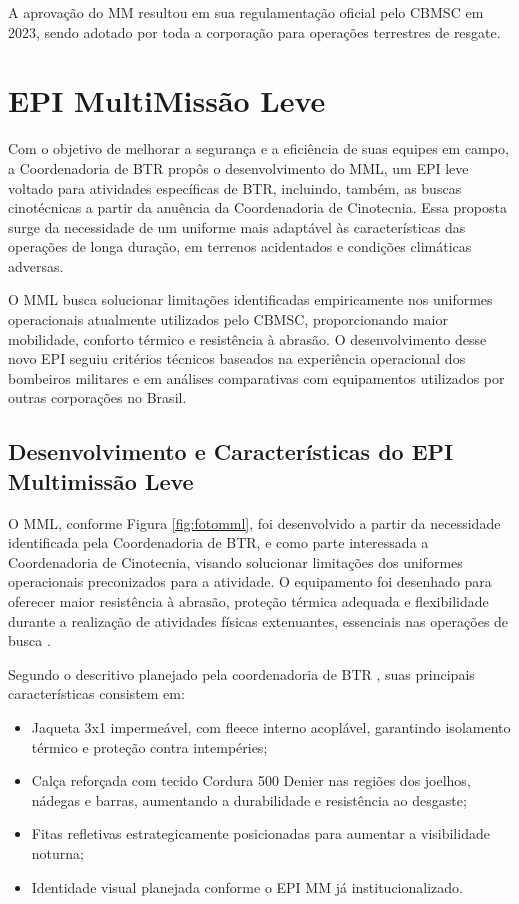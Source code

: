 A aprovação do \acrlong{MM} resultou em sua regulamentação oficial pelo \acrshort{CBMSC} em 2023, 
sendo adotado por toda a corporação para operações terrestres de resgate.

\section{EPI MultiMissão Leve}

Com o objetivo de melhorar a segurança e a eficiência de suas equipes em campo, a Coordenadoria de \acrlong{BTR} propôs o desenvolvimento do \acrfull{MML}, um \acrshort{EPI} leve voltado para atividades específicas de \acrlong{BTR}, incluindo, também, as buscas cinotécnicas a partir da anuência da Coordenadoria de Cinotecnia. Essa proposta surge da necessidade de um uniforme mais adaptável às características das operações de longa duração, em terrenos acidentados e condições climáticas adversas.

O \acrshort{MML} busca solucionar limitações identificadas empiricamente nos uniformes operacionais atualmente utilizados pelo \acrshort{CBMSC}, proporcionando maior mobilidade, conforto térmico e resistência à abrasão. O desenvolvimento desse novo \acrshort{EPI} seguiu critérios técnicos baseados na experiência operacional dos bombeiros militares e em análises comparativas com equipamentos utilizados por outras corporações no Brasil.

\subsection{Desenvolvimento e Características do EPI Multimissão Leve}
    O \acrlong{MML}, conforme Figura \ref{fig:fotomml}, foi desenvolvido a partir da necessidade identificada pela Coordenadoria de \acrshort{BTR}, 
    e como parte interessada a Coordenadoria de Cinotecnia, visando solucionar limitações dos uniformes 
    operacionais preconizados para a atividade. O equipamento foi desenhado para oferecer maior 
    resistência à abrasão, proteção térmica adequada e flexibilidade durante a realização de 
    atividades físicas extenuantes, essenciais nas operações de busca \cite{relMML}.

    Segundo o descritivo planejado pela coordenadoria de \acrlong{BTR} \cite{descritivoMML}, suas principais características consistem em:

\begin{itemize}
    \item Jaqueta 3x1 impermeável, com fleece interno acoplável, garantindo isolamento térmico e proteção contra intempéries;
    \item Calça reforçada com tecido Cordura 500 Denier nas regiões dos joelhos, nádegas e barras, aumentando a durabilidade e resistência ao desgaste;
    \item Fitas refletivas estrategicamente posicionadas para aumentar a visibilidade noturna;
    \item Identidade visual planejada conforme o \acrshort{EPI} \acrlong{MM} já institucionalizado.
\end{itemize}

